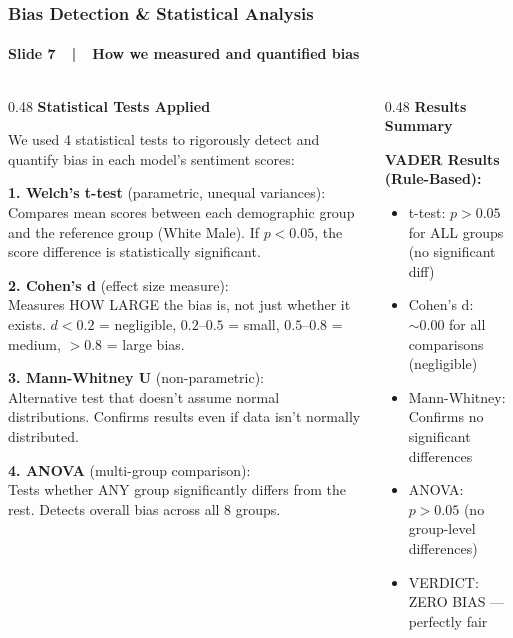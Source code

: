 \documentclass[aspectratio=43,11pt]{beamer}
\begin{document}
\begin{frame}[t]
\frametitle{Bias Detection \& Statistical Analysis}
\framesubtitle{Slide 7~~|~~How we measured and quantified bias}

\vspace{-2pt}
\begin{columns}[T]
\begin{column}{0.48\textwidth}
{\small\bfseries\color{DarkBlue} Statistical Tests Applied}\\[3pt]
{\scriptsize
We used 4 statistical tests to rigorously detect and
quantify bias in each model's sentiment scores:

\vspace{3pt}
\textbf{1. Welch's t-test} (parametric, unequal variances):\\
Compares mean scores between each demographic group
and the reference group (White Male). If $p < 0.05$,
the score difference is statistically significant.

\vspace{3pt}
\textbf{2. Cohen's d} (effect size measure):\\
Measures HOW LARGE the bias is, not just whether it
exists. $d < 0.2$ = negligible, $0.2$--$0.5$ = small,
$0.5$--$0.8$ = medium, $> 0.8$ = large bias.

\vspace{3pt}
\textbf{3. Mann-Whitney U} (non-parametric):\\
Alternative test that doesn't assume normal distributions.
Confirms results even if data isn't normally distributed.

\vspace{3pt}
\textbf{4. ANOVA} (multi-group comparison):\\
Tests whether ANY group significantly differs from
the rest. Detects overall bias across all 8 groups.
}
\end{column}
\begin{column}{0.48\textwidth}
{\small\bfseries\color{RedAccent} Results Summary}\\[3pt]
{\scriptsize
\textbf{VADER Results (Rule-Based):}
\begin{itemize}
  \item t-test: $p > 0.05$ for ALL groups (no significant diff)
  \item Cohen's d: ${\sim}0.00$ for all comparisons (negligible)
  \item Mann-Whitney: Confirms no significant differences
  \item ANOVA: $p > 0.05$ (no group-level differences)
  \item VERDICT: ZERO BIAS --- perfectly fair
\end{itemize}

}
\end{column}
\end{columns}
\end{frame}
\end{document}
